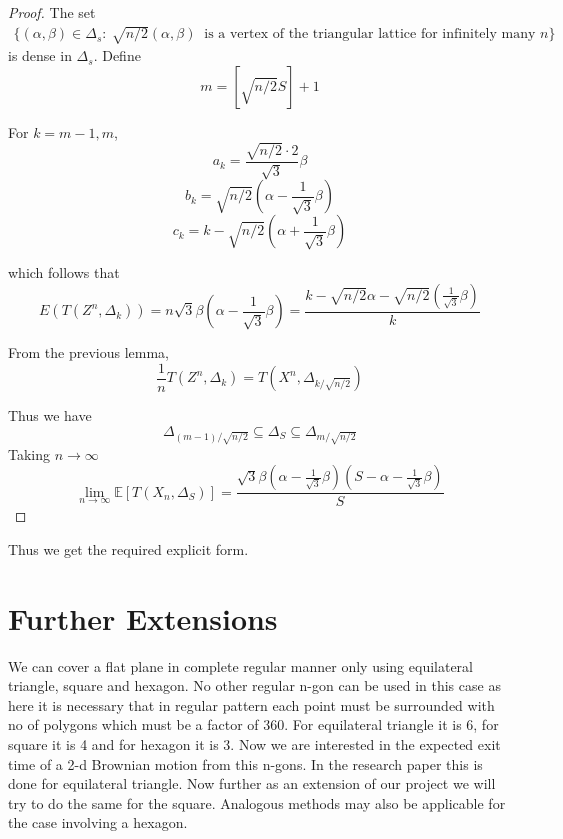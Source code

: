 \documentclass[11pt, a4paper, oneside]{report}
\numberwithin{equation}{section}
\begin{document}
\begin{proof}



The set
\begin{align*}
\big\{(\alpha, \beta) \in \Delta_s :\ 
\sqrt{n/2}(\alpha, \beta)\ 
\text{ is a vertex of the triangular lattice for infinitely many } n\big\}
\end{align*}
is dense in $\Delta_s$.
Define
\[
m =[\sqrt{n/2}S] + 1
\]

For $k = m - 1, m$,
\[
a_k = \frac{\sqrt{n/2} \cdot 2}{\sqrt{3}} \beta
\]
\[
b_k = {\sqrt{n/2}}\left( \alpha - \frac{1}{\sqrt{3}} \beta \right)
\]
\[
c_k = k - \sqrt{n/2} \left( \alpha + \frac{1}{\sqrt{3}} \beta \right)
\]

which follows that
\[
E\left( T(Z^n, \Delta_k) \right) = n \sqrt{3} \beta \left( \alpha - \frac{1}{\sqrt{3}} \beta \right)
= \frac{k - \sqrt{n/2} \alpha - \sqrt{n/2} \left( \frac{1}{\sqrt{3}} \beta \right)}{k}
\]

From the previous lemma,
\[
\frac{1}{n} T\left(Z^n, \Delta_k\right) = T\left(X^n ,\Delta_{k/\sqrt{n/2}} \right)
\]

Thus we have
\[
\Delta_{(m-1)/\sqrt{n/2}} \subseteq \Delta_S \subseteq \Delta_{m/\sqrt{n/2}}
\]
Taking $n \to \infty$
\[
\lim_{n \to \infty} \mathbb{E}[T(X_n, \Delta_{S})] = 
\frac{ \sqrt{3}\beta\left(\alpha - \frac{1}{\sqrt{3}}\beta\right)\left(S - \alpha - \frac{1}{\sqrt{3}}\beta\right) }{S}
\]
\end{proof}
\noindent Thus we get the required explicit form.
\chapter{Further Extensions}
We can cover a flat plane in complete regular manner only using equilateral triangle, square and hexagon. No other regular n-gon can be used in this case as here it is necessary that in regular pattern each point must be surrounded with no of polygons which must be a factor of 360. For equilateral triangle it is 6, for square it is 4 and for hexagon it is 3. Now we are interested in the expected exit time of a 2-d Brownian motion from this n-gons. In the research paper \cite{research} this is done for equilateral triangle. Now further as an extension of our project we will try to do the same for the square. Analogous methods may also be applicable for the case involving a hexagon.
\end{document}

